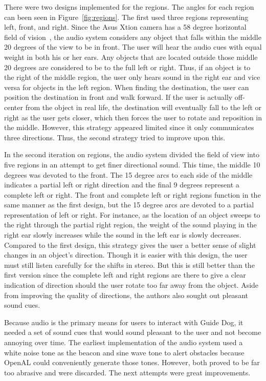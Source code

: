 There were two designs implemented for the regions. The angles for each region 
can been seen in Figure~\ref{fig:regions}. The first used three regions 
representing left, front, and right. Since the Asus Xtion camera has a 58 degree 
horizontal field of vision~\cite{xtion-website}, the audio system considers any 
object that falls within the middle 20 degrees of the view to be in front. The 
user will hear the audio cues with equal weight in both his or her ears. Any 
objects that are located outside those middle 20 degrees are considered to be to 
the full left or right. Thus, if an object is to the right of the middle region, 
the user only hears sound in the right ear and vice versa for objects in the 
left region. When finding the destination, the user can position the destination 
in front and walk forward. If the user is actually off-center from the object in 
real life, the destination will eventually fall to the left or right as the user 
gets closer, which then forces the user to rotate and reposition in the 
middle. However, this strategy appeared limited since it only communicates 
three directions. Thus, the second strategy tried to improve upon this.

In the second iteration on regions, the audio system divided the field of view
into five regions in an attempt to get finer directional sound. This time, the
middle 10 degrees was devoted to the front. The 15 degree arcs to each side of
the middle indicates a partial left or right direction and the final 9 degrees
represent a complete left or right. The front and complete left or right regions
function in the same manner as the first design, but the 15 degree arcs are
devoted to a partial representation of left or right. For instance, as the
location of an object sweeps to the right through the partial right region, the 
weight of the sound playing in the right ear slowly increases while the sound in
the left ear is slowly decreases. Compared to the first design, this strategy
gives the user a better sense of slight changes in an object's direction. Though
it is easier with this design, the user must still listen carefully for the
shifts in stereo. But this is still better than the first version since the
complete left and right regions are there to give a clear indication of
direction should the user rotate too far away from the object. Aside from
improving the quality of directions, the authors also sought out pleasant sound
cues.

Because audio is the primary means for users to interact with Guide Dog, it
needed a set of sound cues that would sound pleasant to the user and not become
annoying over time. The earliest implementation of the audio system used a white
noise tone as the beacon and sine wave tone to alert obstacles because OpenAL
could conveniently generate those tones. However, both proved to be far too
abrasive and were discarded. The next attempts were great improvements.

